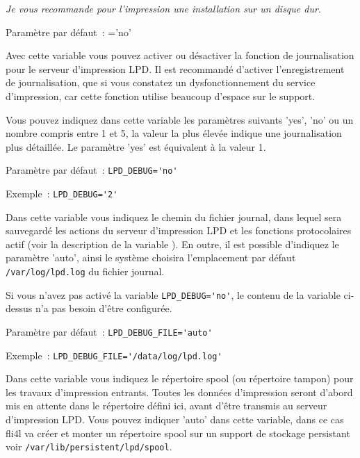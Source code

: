     \emph{Je vous recommande pour l'impression une installation sur un disque dur.}

    Paramètre par défaut~: ='no'

\begin{description}



    Avec cette variable vous pouvez activer ou désactiver la fonction de
	journalisation pour le serveur d'impression LPD. Il est recommandé d'activer
	l'enregistrement de journalisation, que si vous constatez un dysfonctionnement
	du service d'impression, car cette fonction utilise beaucoup d'espace sur
	le support.

	Vous pouvez indiquez dans cette variable les paramètres suivants 'yes', 'no' ou
	un nombre compris entre 1 et 5, la valeur la plus élevée indique une journalisation
	plus détaillée. Le paramètre 'yes' est équivalent à la valeur 1.

    Paramètre par défaut~: \verb+LPD_DEBUG='no'+

    Exemple~: \verb+LPD_DEBUG='2'+



    Dans cette variable vous indiquez le chemin du fichier journal, dans lequel sera
	sauvegardé les actions du serveur d'impression LPD et les fonctions protocolaires actif
	(voir la description de la variable ). En outre, il
	est possible d'indiquez le paramètre 'auto', ainsi le système choisira l'emplacement
	par défaut \texttt{/var/log/lpd.log} du fichier journal.

    Si vous n'avez pas activé la variable \verb+LPD_DEBUG='no'+, le contenu de la variable
	ci-dessus n'a pas besoin d'être configurée.

    Paramètre par défaut~: \verb+LPD_DEBUG_FILE='auto'+

    Exemple~: \verb+LPD_DEBUG_FILE='/data/log/lpd.log'+



    Dans cette variable vous indiquez le répertoire spool (ou répertoire tampon) pour
	les travaux d'impression entrants. Toutes les données d'impression seront d'abord
	mis en attente dans le répertoire défini ici, avant d'être transmis au serveur
	d'impression LPD. Vous pouvez indiquer 'auto' dans cette variable, dans ce cas fli4l
	va créer et monter un répertoire spool sur un support de stockage persistant voir
	\texttt{/var/lib/persistent/lpd/spool}.


\end{description}
